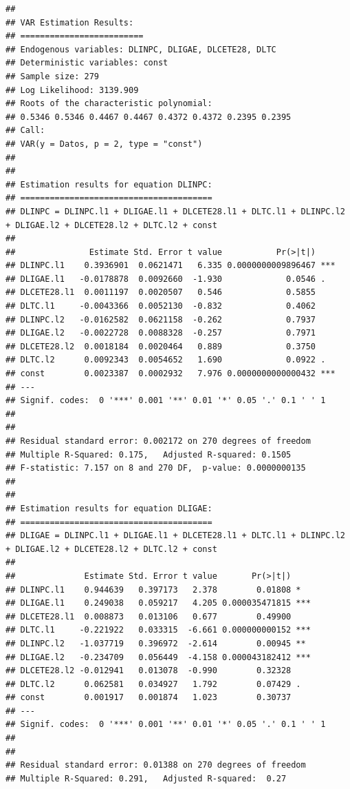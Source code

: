 \documentclass[
]{book}
\begin{document}
\begin{verbatim}
## 
## VAR Estimation Results:
## ========================= 
## Endogenous variables: DLINPC, DLIGAE, DLCETE28, DLTC 
## Deterministic variables: const 
## Sample size: 279 
## Log Likelihood: 3139.909 
## Roots of the characteristic polynomial:
## 0.5346 0.5346 0.4467 0.4467 0.4372 0.4372 0.2395 0.2395
## Call:
## VAR(y = Datos, p = 2, type = "const")
## 
## 
## Estimation results for equation DLINPC: 
## ======================================= 
## DLINPC = DLINPC.l1 + DLIGAE.l1 + DLCETE28.l1 + DLTC.l1 + DLINPC.l2 + DLIGAE.l2 + DLCETE28.l2 + DLTC.l2 + const 
## 
##               Estimate Std. Error t value           Pr(>|t|)    
## DLINPC.l1    0.3936901  0.0621471   6.335 0.0000000009896467 ***
## DLIGAE.l1   -0.0178878  0.0092660  -1.930             0.0546 .  
## DLCETE28.l1  0.0011197  0.0020507   0.546             0.5855    
## DLTC.l1     -0.0043366  0.0052130  -0.832             0.4062    
## DLINPC.l2   -0.0162582  0.0621158  -0.262             0.7937    
## DLIGAE.l2   -0.0022728  0.0088328  -0.257             0.7971    
## DLCETE28.l2  0.0018184  0.0020464   0.889             0.3750    
## DLTC.l2      0.0092343  0.0054652   1.690             0.0922 .  
## const        0.0023387  0.0002932   7.976 0.0000000000000432 ***
## ---
## Signif. codes:  0 '***' 0.001 '**' 0.01 '*' 0.05 '.' 0.1 ' ' 1
## 
## 
## Residual standard error: 0.002172 on 270 degrees of freedom
## Multiple R-Squared: 0.175,   Adjusted R-squared: 0.1505 
## F-statistic: 7.157 on 8 and 270 DF,  p-value: 0.0000000135 
## 
## 
## Estimation results for equation DLIGAE: 
## ======================================= 
## DLIGAE = DLINPC.l1 + DLIGAE.l1 + DLCETE28.l1 + DLTC.l1 + DLINPC.l2 + DLIGAE.l2 + DLCETE28.l2 + DLTC.l2 + const 
## 
##              Estimate Std. Error t value       Pr(>|t|)    
## DLINPC.l1    0.944639   0.397173   2.378        0.01808 *  
## DLIGAE.l1    0.249038   0.059217   4.205 0.000035471815 ***
## DLCETE28.l1  0.008873   0.013106   0.677        0.49900    
## DLTC.l1     -0.221922   0.033315  -6.661 0.000000000152 ***
## DLINPC.l2   -1.037719   0.396972  -2.614        0.00945 ** 
## DLIGAE.l2   -0.234709   0.056449  -4.158 0.000043182412 ***
## DLCETE28.l2 -0.012941   0.013078  -0.990        0.32328    
## DLTC.l2      0.062581   0.034927   1.792        0.07429 .  
## const        0.001917   0.001874   1.023        0.30737    
## ---
## Signif. codes:  0 '***' 0.001 '**' 0.01 '*' 0.05 '.' 0.1 ' ' 1
## 
## 
## Residual standard error: 0.01388 on 270 degrees of freedom
## Multiple R-Squared: 0.291,   Adjusted R-squared:  0.27 

\end{verbatim}
\end{document}
